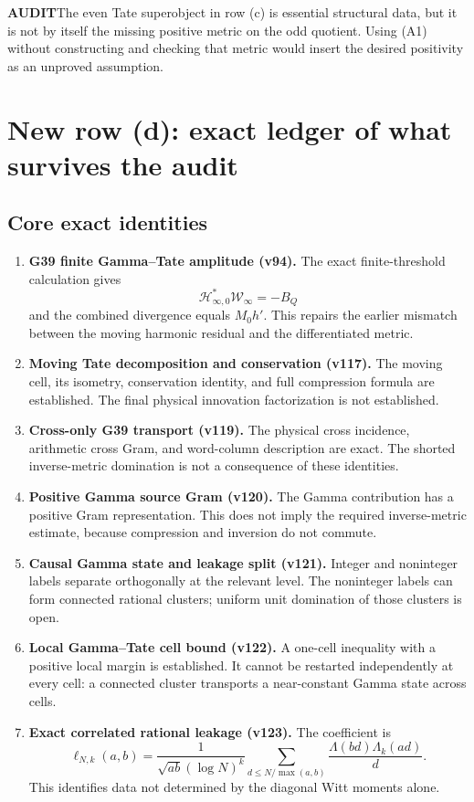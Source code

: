 \documentclass[11pt]{article}
\newcommand{\PROVED}{\textcolor{green!45!black}{\textbf{PROVED}}}
\newcommand{\AUDIT}{\textcolor{orange!80!black}{\textbf{AUDIT}}}
\begin{document}
\medskip
\noindent\AUDIT\quad The even Tate superobject in row (c) is essential structural
data, but it is not by itself the missing positive metric on the odd quotient.
Using (A1) without constructing and checking that metric would insert the desired
positivity as an unproved assumption.

\section{New row (d): exact ledger of what survives the audit}

\subsection{Core exact identities}

\begin{enumerate}
\item[\PROVED] \textbf{G39 finite Gamma--Tate amplitude (v94).}
The exact finite-threshold calculation gives
\[
 \mathcal H_{\infty,0}^*\mathcal W_\infty=-B_Q
\]
and the combined divergence equals \(M_0h'\).  This repairs the earlier mismatch
between the moving harmonic residual and the differentiated metric.

\item[\PROVED] \textbf{Moving Tate decomposition and conservation (v117).}
The moving cell, its isometry, conservation identity, and full compression formula
are established.  The final physical innovation factorization is not established.

\item[\PROVED] \textbf{Cross-only G39 transport (v119).}
The physical cross incidence, arithmetic cross Gram, and word-column description
are exact.  The shorted inverse-metric domination is not a consequence of these
identities.

\item[\PROVED] \textbf{Positive Gamma source Gram (v120).}
The Gamma contribution has a positive Gram representation.  This does not imply
the required inverse-metric estimate, because compression and inversion do not
commute.

\item[\PROVED] \textbf{Causal Gamma state and leakage split (v121).}
Integer and noninteger labels separate orthogonally at the relevant level.  The
noninteger labels can form connected rational clusters; uniform unit domination
of those clusters is open.

\item[\PROVED] \textbf{Local Gamma--Tate cell bound (v122).}
A one-cell inequality with a positive local margin is established.  It cannot be
restarted independently at every cell: a connected cluster transports a
near-constant Gamma state across cells.

\item[\PROVED] \textbf{Exact correlated rational leakage (v123).}
The coefficient is
\[
 \ell_{N,k}(a,b)=
 \frac{1}{\sqrt{ab}(\log N)^k}
 \sum_{d\leq N/\max(a,b)}
 \frac{\Lambda(bd)\Lambda_k(ad)}{d}.
\]
This identifies data not determined by the diagonal Witt moments alone.
\end{enumerate}
\end{document}
